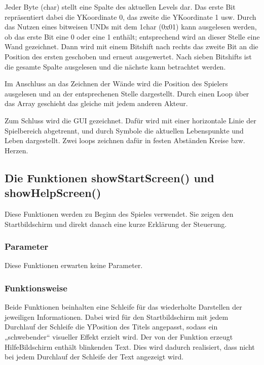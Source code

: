 \documentclass[letterpaper,10pt,ngerman]{sphinxmanual}
\begin{document}
Jeder Byte (char) stellt eine Spalte des aktuellen Levels dar. Das erste Bit
repräsentiert dabei die Y\sphinxhyphen{}Koordinate 0, das zweite die Y\sphinxhyphen{}Koordinate 1
usw. Durch das Nutzen eines bitweisen UNDs mit dem 1\sphinxhyphen{}char (0x01) kann
ausgelesen werden, ob das erste Bit eine 0 oder eine 1 enthält; entsprechend
wird an dieser Stelle eine Wand gezeichnet. Dann wird mit einem Bitshift nach
rechts das zweite Bit an die Position des ersten geschoben und erneut
ausgewertet. Nach sieben Bitshifts ist die gesamte Spalte ausgelesen und die
nächste kann betrachtet werden.

Im Anschluss an das Zeichnen der Wände wird die Position des Spielers
ausgelesen und an der entsprechenen Stelle dargestellt. Durch einen Loop über
das Array  geschieht das gleiche mit jedem anderen Akteur.

Zum Schluss wird die GUI gezeichnet. Dafür wird mit einer horizontale Linie
der Spielbereich abgetrennt, und durch Symbole die aktuellen Lebenspunkte und
Leben dargestellt. Zwei loops zeichnen dafür in festen Abständen Kreise bzw.
Herzen.


\subsection{Die Funktionen showStartScreen() und showHelpScreen()}
\label{\detokenize{programming:die-funktionen-showstartscreen-und-showhelpscreen}}
Diese Funktionen werden zu Beginn des Spieles verwendet. Sie zeigen den
Startbildschirm und direkt danach eine kurze Erklärung der Steuerung.


\subsubsection{Parameter}
\label{\detokenize{programming:id7}}
Diese Funktionen erwarten keine Parameter.


\subsubsection{Funktionsweise}
\label{\detokenize{programming:id8}}
Beide Funktionen beinhalten eine Schleife für das wiederholte Darstellen der
jeweiligen Informationen. Dabei wird für den Startbildschirm mit jedem
Durchlauf der Schleife die Y\sphinxhyphen{}Position des Titels angepasst, sodass ein
„schwebender“ visueller Effekt erzielt wird. Der von der Funktion
 erzeugt Hilfe\sphinxhyphen{}Bildschirm enthält blinkenden Text. Dies
wird dadurch realisiert, dass nicht bei jedem Durchlauf der Schleife der Text
angezeigt wird.
\end{document}
